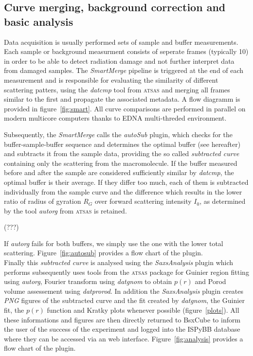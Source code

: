 \documentclass[preprint,pdf]{iucr}              %
\begin{document}
\subsection{Curve merging, background correction and basic analysis}
\label{SM}
Data acquisition is usually performed sets of sample and buffer measurements.
Each sample or background measurment consists of seperate frames (typically 10)
in order to be able to detect radiation damage and not further interpret data from damaged samples.
The \textit{SmartMerge} pipeline is triggered at the end of each measurement
and is responsible for evaluating the similarity of different scattering
patters, using the \textit{datcmp} tool from \textsc{atsas} and merging all frames
similar to the first and propagate the associated metadata.
A flow diagramm is provided in figure~\ref{fig:smart}.
All curve comparisons are performed in parallel on modern multicore
computers thanks to EDNA multi-threded environment.

Subsequently, the \textit{SmartMerge} calls the \textit{autoSub} plugin, which
checks for the buffer-sample-buffer sequence and determines the optimal buffer
(see hereafter) and subtracts it from the sample data,  providing the so called
\textit{subtracted curve} containing only the scattering from the macromolecule.
If the buffer measured before and after the sample are considered sufficiently
similar by \textit{datcmp}, the optimal buffer is their average.
If they differ too much, each of them is subtracted individually from the
sample curve and the difference which results in the lower ratio of radius
of gyration $R_{G}$ over forward scattering intensity $I_{0}$, as determined by
the tool \textit{autorg} from \textsc{atsas} is retained.

(???)

If \textit{autorg} fails for both buffers, we simply use the one with the lower
total scattering. Figure~\ref{fig:autosub} provides a flow chart of the plugin.\\

Finally this \textit{subtracted curve} is analysed using the
\textit{SaxsAnalysis} plugin which performs subsequently uses tools from the \textsc{atsas} package for Guinier region fitting
using \textit{autorg}, Fourier transform using \textit{datgnom} to obtain
$p(r)$ and Porod volume assessement using \textit{datprorod}.
In addition the \textit{SaxsAnalysis} plugin creates \textit{PNG} figures of
the subtracted curve and the fit created by \textit{datgnom}, the Guinier fit, the $p(r)$ function and Kratky plots whenever possible (figure~\ref{plots}).
All these informations and figures are then directly returned to BsxCube to inform the user
of the success of the experiment and logged into the ISPyBB
database \cite{ispybb} where they can be accessed via an web interface.
Figure~\ref{fig:analysis} provides a flow chart of the plugin.
\end{document}

